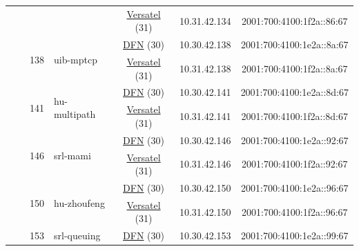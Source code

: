 \begin{small}
\begin{center}
\begin{longtable}{|c|c|c|c|c|c|c|c|}
  &  &  &  & \multicolumn{2}{|c|}{\tiny{\href{http://www.versatel.de}{Versatel} (31)}} & \tiny{10.31.42.134} & \tiny{2001:700:4100:1f2a::86:67} \\* \cline{3-3}\cline{4-4}\cline{5-5}\cline{6-6}\cline{7-7}\cline{8-8}
  &  & \multirow{2}{*}{\tiny{138}} & \multicolumn{1}{|l|}{\multirow{2}{*}{\tiny{uib-mptcp}}} & \multicolumn{2}{|c|}{\tiny{\href{https://www.dfn.de}{DFN} (30)}} & \tiny{10.30.42.138} & \tiny{2001:700:4100:1e2a::8a:67} \\* \cline{5-5}\cline{6-6}\cline{7-7}\cline{8-8}
  &  &  &  & \multicolumn{2}{|c|}{\tiny{\href{http://www.versatel.de}{Versatel} (31)}} & \tiny{10.31.42.138} & \tiny{2001:700:4100:1f2a::8a:67} \\* \cline{3-3}\cline{4-4}\cline{5-5}\cline{6-6}\cline{7-7}\cline{8-8}
  &  & \multirow{2}{*}{\tiny{141}} & \multicolumn{1}{|l|}{\multirow{2}{*}{\tiny{hu-multipath}}} & \multicolumn{2}{|c|}{\tiny{\href{https://www.dfn.de}{DFN} (30)}} & \tiny{10.30.42.141} & \tiny{2001:700:4100:1e2a::8d:67} \\* \cline{5-5}\cline{6-6}\cline{7-7}\cline{8-8}
  &  &  &  & \multicolumn{2}{|c|}{\tiny{\href{http://www.versatel.de}{Versatel} (31)}} & \tiny{10.31.42.141} & \tiny{2001:700:4100:1f2a::8d:67} \\* \cline{3-3}\cline{4-4}\cline{5-5}\cline{6-6}\cline{7-7}\cline{8-8}
  &  & \multirow{2}{*}{\tiny{146}} & \multicolumn{1}{|l|}{\multirow{2}{*}{\tiny{srl-mami}}} & \multicolumn{2}{|c|}{\tiny{\href{https://www.dfn.de}{DFN} (30)}} & \tiny{10.30.42.146} & \tiny{2001:700:4100:1e2a::92:67} \\* \cline{5-5}\cline{6-6}\cline{7-7}\cline{8-8}
  &  &  &  & \multicolumn{2}{|c|}{\tiny{\href{http://www.versatel.de}{Versatel} (31)}} & \tiny{10.31.42.146} & \tiny{2001:700:4100:1f2a::92:67} \\* \cline{3-3}\cline{4-4}\cline{5-5}\cline{6-6}\cline{7-7}\cline{8-8}
  &  & \multirow{2}{*}{\tiny{150}} & \multicolumn{1}{|l|}{\multirow{2}{*}{\tiny{hu-zhoufeng}}} & \multicolumn{2}{|c|}{\tiny{\href{https://www.dfn.de}{DFN} (30)}} & \tiny{10.30.42.150} & \tiny{2001:700:4100:1e2a::96:67} \\* \cline{5-5}\cline{6-6}\cline{7-7}\cline{8-8}
  &  &  &  & \multicolumn{2}{|c|}{\tiny{\href{http://www.versatel.de}{Versatel} (31)}} & \tiny{10.31.42.150} & \tiny{2001:700:4100:1f2a::96:67} \\* \cline{3-3}\cline{4-4}\cline{5-5}\cline{6-6}\cline{7-7}\cline{8-8}
  &  & \multirow{2}{*}{\tiny{153}} & \multicolumn{1}{|l|}{\multirow{2}{*}{\tiny{srl-queuing}}} & \multicolumn{2}{|c|}{\tiny{\href{https://www.dfn.de}{DFN} (30)}} & \tiny{10.30.42.153} & \tiny{2001:700:4100:1e2a::99:67} \\* \cline{5-5}\cline{6-6}\cline{7-7}\cline{8-8}

\end{longtable}
\end{center}
\end{small}
